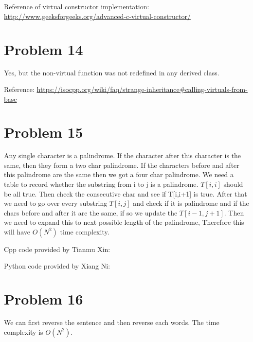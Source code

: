 \documentclass[12pt]{amsart}
\begin{document}
\begin{framed}

\end{framed}

Reference of virtual constructor implementation:
\newline
\url{http://www.geeksforgeeks.org/advanced-c-virtual-constructor/}

\section{Problem 14}
Yes, but the non-virtual function was not redefined in any derived class.

Reference: \url{https://isocpp.org/wiki/faq/strange-inheritance#calling-virtuals-from-base}


\section{Problem 15}
Any single character is a palindrome. If the character after this character is the same, then they form a two char palindrome. If the characters before and after this palindrome are the same then we got a four char palindrome. 
We need a table to record whether the substring from i to j is a palindrome. 
$T[i,i]$ should be all true. Then check the consecutive char and see if T[i,i+1] is true. 
After that we need to go over every substring $T[i,j]$ and check if it is palindrome and if the chars before and after it are the same, if so we update the $T[i-1,j+1]$. Then we need to expand this to next possible length of the palindrome, Therefore this will have $O(N^2)$ time complexity. 

Cpp code provided by Tianmu Xin:
\begin{framed}

\end{framed}


Python code provided by Xiang Ni:
\begin{framed}

\end{framed}


\section{Problem 16}
We can first reverse the sentence and then reverse each words. The time complexity is $O(N^2)$.

\begin{framed}

\end{framed}
\end{document}

